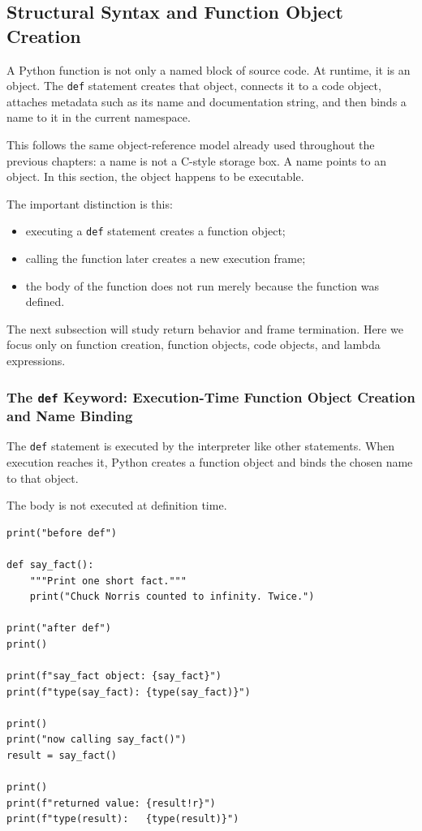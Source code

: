 \subsection{Structural Syntax and Function Object Creation}

A Python function is not only a named block of source code. At runtime, it is an object. The \texttt{def} statement creates that object, connects it to a code object, attaches metadata such as its name and documentation string, and then binds a name to it in the current namespace.

This follows the same object-reference model already used throughout the previous chapters: a name is not a C-style storage box. A name points to an object. In this section, the object happens to be executable.

The important distinction is this:

\begin{itemize}
    \item executing a \texttt{def} statement creates a function object;
    \item calling the function later creates a new execution frame;
    \item the body of the function does not run merely because the function was defined.
\end{itemize}

The next subsection will study return behavior and frame termination. Here we focus only on function creation, function objects, code objects, and lambda expressions.

\subsubsection{The \texttt{def} Keyword: Execution-Time Function Object Creation and Name Binding}

The \texttt{def} statement is executed by the interpreter like other statements. When execution reaches it, Python creates a function object and binds the chosen name to that object.

The body is not executed at definition time.

\begin{verbatim}
print("before def")

def say_fact():
    """Print one short fact."""
    print("Chuck Norris counted to infinity. Twice.")

print("after def")
print()

print(f"say_fact object: {say_fact}")
print(f"type(say_fact): {type(say_fact)}")

print()
print("now calling say_fact()")
result = say_fact()

print()
print(f"returned value: {result!r}")
print(f"type(result):   {type(result)}")
\end{verbatim}

